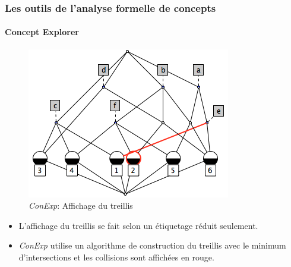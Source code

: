 \documentclass[french]{beamer}
\begin{document}
\begin{frame}
\frametitle{Les outils de l'analyse formelle de concepts}
\framesubtitle{Concept Explorer}
\begin{figure}[H]
\begin{center}\includegraphics[scale=0.45]{figures/conexp-lattice.png}\end{center}
\caption{\emph{ConExp}: Affichage du treillis}
\label{cap:fig:conexp-lattice}
\end{figure}
\begin{itemize}
\item L'affichage du treillis se fait selon un étiquetage réduit seulement.
\item \emph{ConExp} utilise un algorithme de construction du treillis avec le minimum d'intersections et les collisions sont affichées en rouge.
\end{itemize}
\end{frame}
\end{document}
